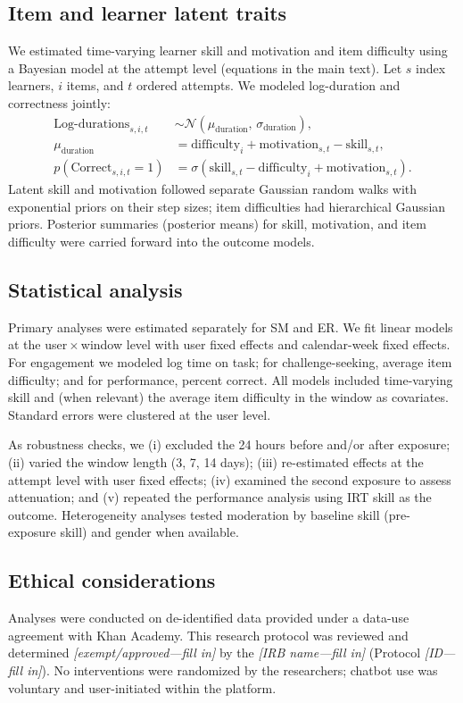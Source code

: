 \documentclass[11pt]{report}
\begin{document}
\begin{mainf}
\subsection{Item and learner latent traits}
We estimated time-varying learner skill and motivation and item difficulty using a Bayesian model at the attempt level (equations in the main text).
Let \(s\) index learners, \(i\) items, and \(t\) ordered attempts. We modeled log-duration and correctness jointly:
\begin{align*}
    \text{Log-durations}_{s,i,t} &\sim \mathcal{N}(\mu_{\text{duration}}, \, \sigma_{\text{duration}}),\\
    \mu_{\text{duration}} &= \text{difficulty}_i + \text{motivation}_{s,t} - \text{skill}_{s,t},\\
    p(\text{Correct}_{s,i,t}=1) &= \sigma(\text{skill}_{s,t} - \text{difficulty}_i + \text{motivation}_{s,t}).
\end{align*}
Latent skill and motivation followed separate Gaussian random walks with exponential priors on their step sizes; item difficulties had hierarchical Gaussian priors. Posterior summaries (posterior means) for skill, motivation, and item difficulty were carried forward into the outcome models.

\subsection{Statistical analysis}
Primary analyses were estimated separately for SM and ER.
We fit linear models at the user\,\(\times\,\)window level with user fixed effects and calendar-week fixed effects. For engagement we modeled log time on task; for challenge-seeking, average item difficulty; and for performance, percent correct. All models included time-varying skill and (when relevant) the average item difficulty in the window as covariates. Standard errors were clustered at the user level.

As robustness checks, we (i) excluded the 24 hours before and/or after exposure; (ii) varied the window length (3, 7, 14 days); (iii) re-estimated effects at the attempt level with user fixed effects; (iv) examined the second exposure to assess attenuation; and (v) repeated the performance analysis using IRT skill as the outcome.
Heterogeneity analyses tested moderation by baseline skill (pre-exposure skill) and gender when available.

\subsection{Ethical considerations}
Analyses were conducted on de-identified data provided under a data-use agreement with Khan Academy.
This research protocol was reviewed and determined \emph{[exempt/approved—fill in]} by the \emph{[IRB name—fill in]} (Protocol \emph{[ID—fill in]}).
No interventions were randomized by the researchers; chatbot use was voluntary and user-initiated within the platform.


\end{mainf}
\end{document}

